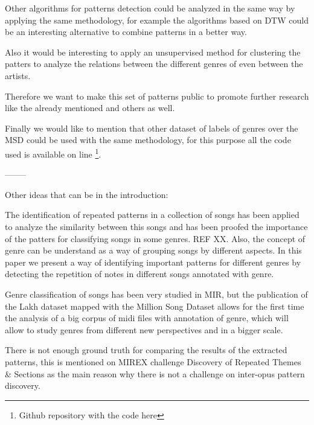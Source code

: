 \documentclass{article}
\begin{document}
Other algorithms for patterns detection could be analyzed in the same way by applying the same methodology, for example the algorithms based on DTW could be an interesting alternative to combine patterns in a better way.

Also it would be interesting to apply an unsupervised method for clustering the patters to analyze the relations between the different genres of even between the artists.

Therefore we want to make this set of patterns public to promote further research like the already mentioned and others as well.

Finally we would like to mention that other dataset of labels of genres over the MSD could be used with the same methodology, for this purpose all the code used is available on line \footnote{Github repository with the code here}.




--------

Other ideas that can be in the introduction:

The identification of repeated patterns in a collection of songs has been applied to analyze the similarity between this songs and has been proofed the importance of the patters for classifying songs in some genres. REF XX. Also, the concept of genre can be understand as a way of grouping songs by different aspects. In this paper we present a way of identifying important patterns for different genres by detecting the repetition of notes in different songs annotated with genre. 

Genre classification of songs has been very studied in MIR, but the publication of the Lakh dataset mapped with the Million Song Dataset allows for the first time the analysis of a big corpus of midi files with annotation of genre, which will allow to study genres from different new perspectives and in a bigger scale.

There is not enough ground truth for comparing the results of the extracted patterns, this is mentioned on MIREX challenge Discovery of Repeated Themes \& Sections as the main reason why there is not a challenge on inter-opus pattern discovery. 



%
%
%
%
\end{document}
